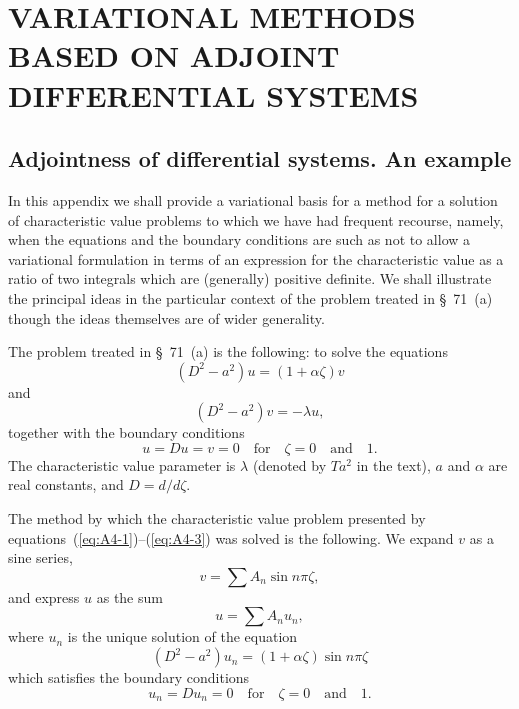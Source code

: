 \chapter{VARIATIONAL METHODS BASED ON ADJOINT DIFFERENTIAL SYSTEMS}
\label{app:IV}

\section{Adjointness of differential systems. An example}
\label{sec:130}

In this appendix we shall provide a variational basis for a method for a
solution of characteristic value problems to which we have had frequent
recourse, namely, when the equations and the boundary conditions are
such as not to allow a variational formulation in terms of an expression for the characteristic value as a ratio of two integrals which
are (generally) positive definite. We shall illustrate the principal ideas
in the particular context of the problem treated in \S~71~(a) though the
ideas themselves are of wider generality.

The problem treated in \S~71~(a) is the following: to solve the equations
\begin{equation}
\label{eq:A4-1}
(D^2 - a^2)u = (1 + \alpha\zeta)v
\end{equation}
and
\begin{equation}
\label{eq:A4-2}
(D^2 - a^2)v = -\lambda u,
\end{equation}
together with the boundary conditions
\begin{equation}
\label{eq:A4-3}
u = Du = v = 0 \quad \text{for} \quad \zeta = 0 \quad \text{and} \quad 1.
\end{equation}
The characteristic value parameter is $\lambda$ (denoted by $Ta^2$ in the text),
$a$ and $\alpha$ are real constants, and $D = d/d\zeta$.

The method by which the characteristic value problem presented by
equations~(\ref{eq:A4-1})--(\ref{eq:A4-3}) was solved is the following.
We expand $v$ as a sine series,
\begin{equation}
\label{eq:A4-4}
v = \sum A_n \sin n\pi\zeta,
\end{equation}
and express $u$ as the sum
\begin{equation}
\label{eq:A4-5}
u = \sum A_n u_n,
\end{equation}
where $u_n$ is the unique solution of the equation
\begin{equation}
\label{eq:A4-6}
(D^2 - a^2)u_n = (1 + \alpha\zeta)\sin n\pi\zeta
\end{equation}
which satisfies the boundary conditions
\begin{equation}
\label{eq:A4-7}
u_n = Du_n = 0 \quad \text{for} \quad \zeta = 0 \quad \text{and} \quad 1.
\end{equation}

